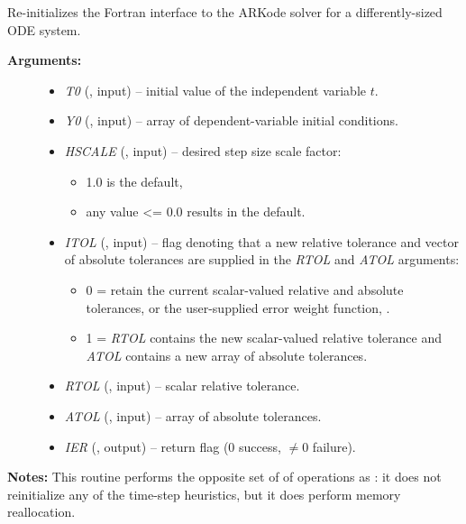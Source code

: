 \documentclass[letterpaper,10pt,english]{sphinxmanual}
\begin{document}
\begin{fulllineitems}
\label{f_interface/Usage:f/_/FARKRESIZE}
Re-initializes the Fortran interface to the ARKode solver for a
differently-sized ODE system.
\begin{description}
\item[{\textbf{Arguments:}}] \leavevmode\begin{itemize}
\item {} 
\emph{T0} (, input) -- initial value of the independent
variable $t$.

\item {} 
\emph{Y0} (, input) -- array of dependent-variable
initial conditions.

\item {} 
\emph{HSCALE} (, input) -- desired step size scale factor:
\begin{itemize}
\item {} 
1.0 is the default,

\item {} 
any value \textless{}= 0.0 results in the default.

\end{itemize}

\item {} 
\emph{ITOL} (, input) -- flag denoting that a new relative
tolerance and vector of absolute tolerances are supplied in
the \emph{RTOL} and \emph{ATOL} arguments:
\begin{itemize}
\item {} 
0 = retain the current scalar-valued relative and absolute
tolerances, or the user-supplied error weight function,
{\hyperref[f_interface/Usage:f/_/FARKEWT]{}}.

\item {} 
1 = \emph{RTOL} contains the new scalar-valued relative tolerance
and \emph{ATOL} contains a new array of absolute tolerances.

\end{itemize}

\item {} 
\emph{RTOL} (, input) -- scalar relative tolerance.

\item {} 
\emph{ATOL} (, input) -- array of absolute tolerances.

\item {} 
\emph{IER} (, output) -- return flag (0 success, $\ne 0$ failure).

\end{itemize}

\end{description}

\textbf{Notes:}
This routine performs the opposite set of of operations as
{\hyperref[f_interface/Usage:f/_/FARKREINIT]{}}: it does not reinitialize any of the
time-step heuristics, but it does perform memory reallocation.

\end{fulllineitems}
\end{document}
